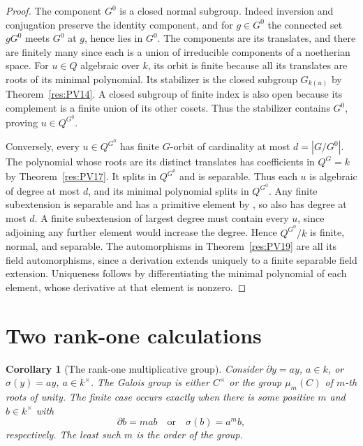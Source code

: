 \documentclass[11pt,oneside,openany]{book}
\newtheorem{corollary}[theorem]{Corollary}
\theoremstyle{definition}
\theoremstyle{remark}
\begin{document}
\begin{proof}
The component \(G^0\) is a closed normal subgroup.
Indeed inversion and conjugation preserve the identity component,
and for \(g\in G^0\) the connected set \(gG^0\) meets \(G^0\) at
\(g\), hence lies in \(G^0\). The components are its translates, and
there are finitely many since each is a union of irreducible
components of a noetherian space.
For \(u\in Q\) algebraic over \(k\), its orbit is finite because
all its translates are roots of its minimal polynomial.
Its stabilizer is the closed subgroup \(G_{k(u)}\) by
Theorem~\ref{res:PV14}. A closed subgroup of finite index is also
open because its complement is a finite union of its other cosets.
Thus the stabilizer contains \(G^0\), proving \(u\in Q^{G^0}\).

Conversely, every \(u\in Q^{G^0}\) has finite \(G\)-orbit of
cardinality at most \(d=|G/G^0|\). The polynomial whose roots are its
distinct translates has coefficients in \(Q^G=k\) by
Theorem~\ref{res:PV17}. It splits in \(Q^{G^0}\) and is separable.
Thus each \(u\) is algebraic of degree at most \(d\), and its minimal
polynomial splits in \(Q^{G^0}\). Any finite subextension is
separable and has a primitive element by
\cite[Section 14.31, PDF p.~113]{mg-d07}, so also has degree at most
\(d\). A finite subextension of largest degree must contain
every \(u\), since adjoining any further element would increase the
degree. Hence \(Q^{G^0}/k\) is finite, normal, and separable. The
automorphisms in Theorem~\ref{res:PV19} are all its field
automorphisms, since a derivation extends uniquely to a finite
separable field extension. Uniqueness follows by differentiating
the minimal polynomial of each element, whose derivative at that
element is nonzero.
\end{proof}

\section{Two rank-one calculations}

\begin{corollary}[The rank-one multiplicative group]
\label{res:PV21}
Consider \(\partial y=a y\), \(a\in k\), or
\(\sigma(y)=a y\), \(a\in k^\times\). The Galois group is
either \(C^\times\) or the group \(\mu_m(C)\) of \(m\)-th roots
of unity. The finite case occurs exactly when there is some
positive \(m\) and \(b\in k^\times\) with
\[
 \partial b=ma b \quad\text{or}\quad \sigma(b)=a^m b,
\]
respectively. The least such \(m\) is the order of the group.
\end{corollary}
\end{document}
